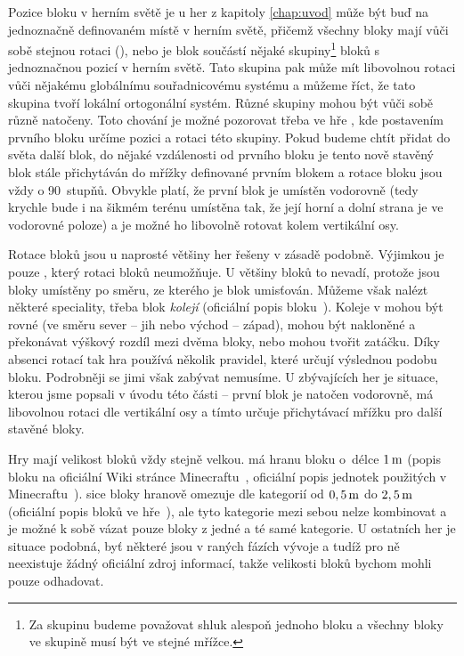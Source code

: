 Pozice bloku v herním světě je u her z kapitoly \ref{chap:uvod} může být buď na jednoznačně definovaném místě v herním světě, přičemž všechny bloky mají vůči sobě stejnou rotaci (\MC{}), nebo je blok součástí nějaké skupiny\footnote{Za skupinu budeme považovat shluk alespoň jednoho bloku a všechny bloky ve skupině musí být ve stejné mřížce.} bloků s jednoznačnou pozicí v herním světě. Tato skupina pak může mít libovolnou rotaci vůči nějakému globálnímu souřadnicovému systému a můžeme říct, že tato skupina tvoří lokální ortogonální systém. Různé skupiny mohou být vůči sobě různě natočeny. Toto chování je možné pozorovat třeba ve hře \ME{}, kde postavením prvního bloku určíme pozici a rotaci této skupiny. Pokud budeme chtít přidat do světa další blok, do nějaké vzdálenosti od prvního bloku je tento nově stavěný blok stále přichytáván do mřížky definované prvním blokem a rotace bloku jsou vždy o 90~stupňů. Obvykle platí, že první blok je umístěn vodorovně (tedy krychle bude i na šikmém terénu umístěna tak, že její horní a dolní strana je ve vodorovné poloze) a je možné ho libovolně rotovat kolem vertikální osy.

Rotace bloků jsou u naprosté většiny her řešeny v zásadě podobně. Výjimkou je pouze \MC{}, který rotaci bloků neumožňuje. U většiny bloků to nevadí, protože jsou bloky umístěny po směru, ze kterého je blok umisťován. Můžeme však nalézt některé speciality, třeba blok \textit{kolejí} (oficiální popis bloku~\citep{mc_rail}). Koleje v  mohou být rovné (ve směru sever -- jih nebo východ -- západ), mohou být nakloněné a překonávat výškový rozdíl mezi dvěma bloky, nebo mohou tvořit zatáčku. Díky absenci rotací tak hra používá několik pravidel, které určují výslednou podobu bloku. Podrobněji se jimi však zabývat nemusíme. U zbývajících her je situace, kterou jsme popsali v úvodu této části -- první blok je natočen vodorovně, má libovolnou rotaci dle vertikální osy a tímto určuje přichytávací mřížku pro další stavěné bloky.

Hry mají velikost bloků vždy stejně velkou. \MC{} má hranu bloku o~délce $1\,\rm m$ (popis bloku na oficiální Wiki stránce Minecraftu~\citep{mc_block}, oficiální popis jednotek použitých v Minecraftu~\citep{mc_units}). \SE{} sice bloky hranově omezuje dle kategorií od $0,5\,\rm m$ do $2,5\,\rm m$ (oficiální popis bloků ve hře~\citep{se_blocks_wiki}), ale tyto kategorie mezi sebou nelze kombinovat a je možné k sobě vázat pouze bloky z jedné a té samé kategorie. U ostatních her je situace podobná, byť některé jsou v raných fázích vývoje a tudíž pro ně neexistuje žádný oficiální zdroj informací, takže velikosti bloků bychom mohli pouze odhadovat. 

